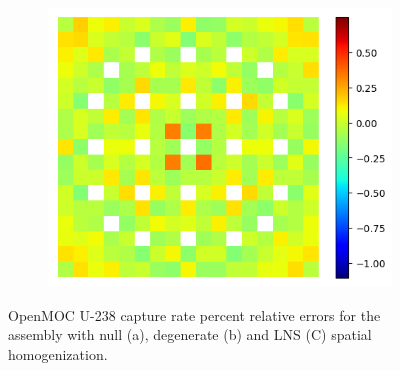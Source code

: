 \begin{figure}[H]
\begin{subfigure}{0.45\textwidth}
\end{subfigure}
\begin{subfigure}{0.45\textwidth}
  \centering
  \includegraphics[width=\linewidth]{figures/assembly/capt-lns-errors}
  \caption{}
  \label{fig:assm-capt-lns-error}
\end{subfigure}
\caption{OpenMOC U-238 capture rate percent relative errors for the assembly with null (a), degenerate (b) and LNS (C) spatial homogenization.}
\label{fig:assm-capt-errors}
\end{figure}

